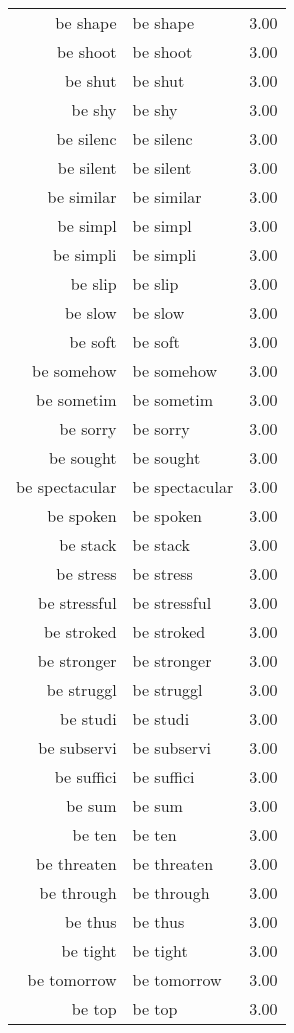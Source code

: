 \begin{table}[ht]
\begin{tabular}{rlr}
  be shape & be shape & 3.00 \\ 
  be shoot & be shoot & 3.00 \\ 
  be shut & be shut & 3.00 \\ 
  be shy & be shy & 3.00 \\ 
  be silenc & be silenc & 3.00 \\ 
  be silent & be silent & 3.00 \\ 
  be similar & be similar & 3.00 \\ 
  be simpl & be simpl & 3.00 \\ 
  be simpli & be simpli & 3.00 \\ 
  be slip & be slip & 3.00 \\ 
  be slow & be slow & 3.00 \\ 
  be soft & be soft & 3.00 \\ 
  be somehow & be somehow & 3.00 \\ 
  be sometim & be sometim & 3.00 \\ 
  be sorry & be sorry & 3.00 \\ 
  be sought & be sought & 3.00 \\ 
  be spectacular & be spectacular & 3.00 \\ 
  be spoken & be spoken & 3.00 \\ 
  be stack & be stack & 3.00 \\ 
  be stress & be stress & 3.00 \\ 
  be stressful & be stressful & 3.00 \\ 
  be stroked & be stroked & 3.00 \\ 
  be stronger & be stronger & 3.00 \\ 
  be struggl & be struggl & 3.00 \\ 
  be studi & be studi & 3.00 \\ 
  be subservi & be subservi & 3.00 \\ 
  be suffici & be suffici & 3.00 \\ 
  be sum & be sum & 3.00 \\ 
  be ten & be ten & 3.00 \\ 
  be threaten & be threaten & 3.00 \\ 
  be through & be through & 3.00 \\ 
  be thus & be thus & 3.00 \\ 
  be tight & be tight & 3.00 \\ 
  be tomorrow & be tomorrow & 3.00 \\ 
  be top & be top & 3.00 \\ 

\end{tabular}
\end{table}
